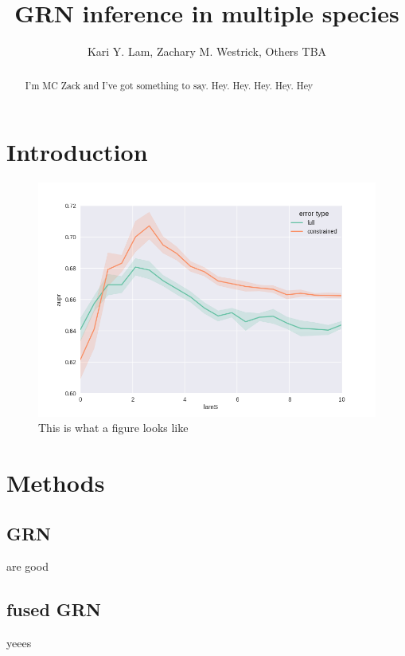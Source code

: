 \documentclass[11pt]{article}
\begin{document}
\title{GRN inference in multiple species}
\author{Kari Y. Lam, Zachary M. Westrick, Others TBA}
\maketitle

\begin{abstract}
I'm MC Zack and I've got something to say. Hey. Hey. Hey. Hey. Hey
\end{abstract}

\section{Introduction}

\begin{figure}
\begin{center}
  \includegraphics[scale=0.45]{simulated.png}
  \caption{\label{fig:figure1} This is what a figure looks like}
  \end{center}
\end{figure}

\section{Methods}
\subsection{GRN}
are good
\subsection{fused GRN}
yeees
\end{document}
